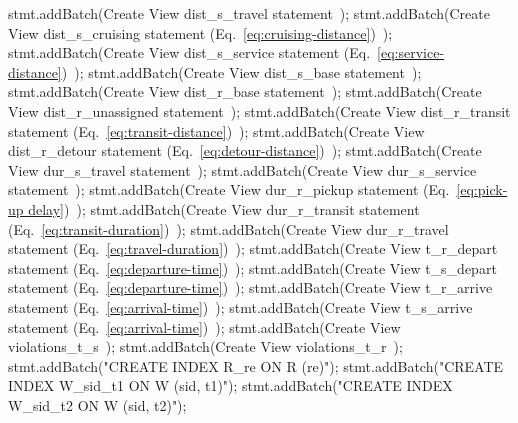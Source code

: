     stmt.addBatch(\LA{}Create View dist\_s\_travel statement~{\nwtagstyle{}}\RA{});
    stmt.addBatch(\LA{}Create View dist\_s\_cruising statement (Eq.~\ref{eq:cruising-distance})~{\nwtagstyle{}}\RA{});
    stmt.addBatch(\LA{}Create View dist\_s\_service statement (Eq.~\ref{eq:service-distance})~{\nwtagstyle{}}\RA{});
    stmt.addBatch(\LA{}Create View dist\_s\_base statement~{\nwtagstyle{}}\RA{});
    stmt.addBatch(\LA{}Create View dist\_r\_base statement~{\nwtagstyle{}}\RA{});
    stmt.addBatch(\LA{}Create View dist\_r\_unassigned statement~{\nwtagstyle{}}\RA{});
    stmt.addBatch(\LA{}Create View dist\_r\_transit statement (Eq.~\ref{eq:transit-distance})~{\nwtagstyle{}}\RA{});
    stmt.addBatch(\LA{}Create View dist\_r\_detour statement (Eq.~\ref{eq:detour-distance})~{\nwtagstyle{}}\RA{});
    stmt.addBatch(\LA{}Create View dur\_s\_travel statement~{\nwtagstyle{}}\RA{});
    stmt.addBatch(\LA{}Create View dur\_s\_service statement~{\nwtagstyle{}}\RA{});
    stmt.addBatch(\LA{}Create View dur\_r\_pickup statement (Eq.~\ref{eq:pick-up delay})~{\nwtagstyle{}}\RA{});
    stmt.addBatch(\LA{}Create View dur\_r\_transit statement (Eq.~\ref{eq:transit-duration})~{\nwtagstyle{}}\RA{});
    stmt.addBatch(\LA{}Create View dur\_r\_travel statement (Eq.~\ref{eq:travel-duration})~{\nwtagstyle{}}\RA{});
    stmt.addBatch(\LA{}Create View t\_r\_depart statement (Eq.~\ref{eq:departure-time})~{\nwtagstyle{}}\RA{});
    stmt.addBatch(\LA{}Create View t\_s\_depart statement (Eq.~\ref{eq:departure-time})~{\nwtagstyle{}}\RA{});
    stmt.addBatch(\LA{}Create View t\_r\_arrive statement (Eq.~\ref{eq:arrival-time})~{\nwtagstyle{}}\RA{});
    stmt.addBatch(\LA{}Create View t\_s\_arrive statement (Eq.~\ref{eq:arrival-time})~{\nwtagstyle{}}\RA{});
    stmt.addBatch(\LA{}Create View violations\_t\_s~{\nwtagstyle{}}\RA{});
    stmt.addBatch(\LA{}Create View violations\_t\_r~{\nwtagstyle{}}\RA{});
    stmt.addBatch("CREATE INDEX R_re ON R (re)");
    stmt.addBatch("CREATE INDEX W_sid_t1 ON W (sid, t1)");
    stmt.addBatch("CREATE INDEX W_sid_t2 ON W (sid, t2)");
